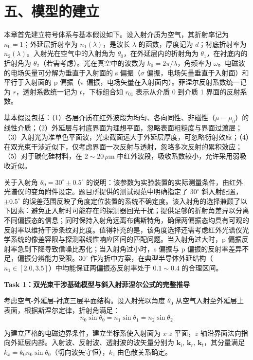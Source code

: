 \documentclass{mcmthesis}
\begin{document}
\begin{table}[htbp]
\section{ 五、模型的建立}

本章首先建立符号体系与基本假设如下。设入射介质为空气，其折射率记为 $n_0 = 1$；外延层折射率为 $n_1(\lambda)$，是波长 $\lambda$ 的函数，厚度记为 $d$；衬底折射率为 $n_2(\lambda)$。入射光在空气中的入射角为 $\theta_0$，在外延层内的折射角为 $\theta_1$，在衬底内的折射角为 $\theta_2$（若需考虑）。光在真空中的波数为 $k_0 = 2\pi/\lambda$，角频率为 $\omega$。电磁波的电场矢量可分解为垂直于入射面的 s 偏振（$\sigma$ 偏振，电场矢量垂直于入射面）和平行于入射面的 p 偏振（$\pi$ 偏振，电场矢量在入射面内）。菲涅尔反射系数统一记为 $r$，透射系数统一记为 $t$，下标组合如 $r_{01}$ 表示从介质 0 到介质 1 界面的反射系数。

基本假设包括：（1）各层介质在红外波段为均匀、各向同性、非磁性（$\mu = \mu_0$）的线性介质；（2）外延层与衬底界面为理想平面，忽略表面粗糙度与界面过渡层；（3）入射光为准单色平面波，光束截面远大于外延层厚度，可忽略衍射效应；（4）在双光束干涉近似下，仅考虑界面一次反射与透射，忽略多次反射的累积效应；（5）对于碳化硅材料，在 $2\sim 20\,\mu\text{m}$ 中红外波段，吸收系数较小，允许采用弱吸收近似。

关于入射角 $\theta_0 = 30^\circ \pm 0.5^\circ$ 的说明：该参数为实验装置的实际测量条件，由红外光谱仪的变角附件设定。题目所提供的测试规范中明确指定了 $30^\circ$ 斜入射配置，$\pm 0.5^\circ$ 的误差范围反映了角度定位装置的系统不确定度。该入射角的选择兼顾了以下因素：避免正入射时可能存在的探测器回光干扰；提供足够的折射角差异以分离不同偏振态的信息；同时保持入射角远离布儒斯特角，确保两偏振态均具有可观的反射率以维持干涉条纹对比度。值得补充的是，该角度选择还需考虑红外光谱仪光学系统的像差容限与探测器线性响应区间的匹配问题。当入射角过大时，p 偏振反射率急剧下降导致信噪比恶化；当入射角过小时，s 偏振与 p 偏振的反射率差异不足，偏振分辨能力受限。$30^\circ$ 作为折中方案，在典型半导体外延结构（$n_1 \in [2.0, 3.5]$）中均能保证两偏振态反射率处于 $0.1 \sim 0.4$ 的合理区间。

\textbf{Task 1：双光束干涉基础模型与斜入射菲涅尔公式的完整推导}

考虑空气-外延层-衬底三层平面结构。设入射光以角度 $\theta_0$ 从空气入射至外延层上表面，根据斯涅尔定律，折射角满足：
$$n_0\sin\theta_0 = n_1\sin\theta_1 = n_2\sin\theta_2 \tag{1}$$

为建立严格的电磁边界条件，建立坐标系使入射面为 $x$-$z$ 平面，$z$ 轴沿界面法向指向外延层内部。入射波、反射波、透射波的波矢量分别为 $\mathbf{k}_i$, $\mathbf{k}_r$, $\mathbf{k}_t$，其分量满足 $k_x = k_0 n_0\sin\theta_0$（切向波矢守恒），$k_z$ 由色散关系确定。


\end{table}
\end{document}
